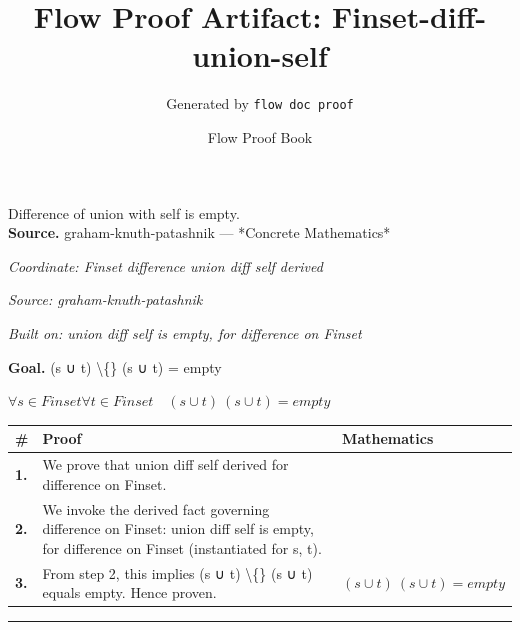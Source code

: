 \documentclass[11pt]{article}
\title{Flow Proof Artifact: Finset-diff-union-self}
\author{Generated by \texttt{flow doc proof}}
\date{Flow Proof Book}
\theoremstyle{definition}
\begin{document}
\maketitle
Difference of union with self is empty.\\[0.5em]
\textbf{Source.} graham-knuth-patashnik — *Concrete Mathematics*\\[0.5em]
\bigskip
{}\par
\smallskip\noindent\textit{Coordinate: Finset \cdot difference \cdot union diff self derived}\par
\smallskip\noindent\textit{Source: graham-knuth-patashnik}\par
\smallskip\noindent\textit{Built on: union diff self is empty, for difference on Finset}\par
\medskip
\noindent\textbf{Goal.} (s ∪ t) \textbackslash\{\} (s ∪ t) = empty\par
\noindent$\displaystyle \forall s \in Finset \forall t \in Finset\quad (s ∪ t) \ (s ∪ t) = empty$\par
\medskip
\noindent
\begin{tabular}{@{} >{\raggedright\arraybackslash}p{} >{\raggedright\arraybackslash}p{} >{\raggedleft\arraybackslash}p{} @{}}
\textbf{\#} & \textbf{Proof} & \textbf{Mathematics} \\
\midrule
\textbf{1.} & We prove that union diff self derived for difference on Finset. & \\[0.45em]
\textbf{2.} & We invoke the derived fact governing difference on Finset: union diff self is empty, for difference on Finset (instantiated for s, t). & \\[0.45em]
\textbf{3.} & From step 2, this implies (s ∪ t) \textbackslash\{\} (s ∪ t) equals empty. Hence proven. & $\displaystyle (s ∪ t) \ (s ∪ t) = empty$ \\[0.45em]
\bottomrule
\end{tabular}
\label{thm:Finset-difference-union_diff_self_derived}
\par\medskip\hrule
\end{document}
